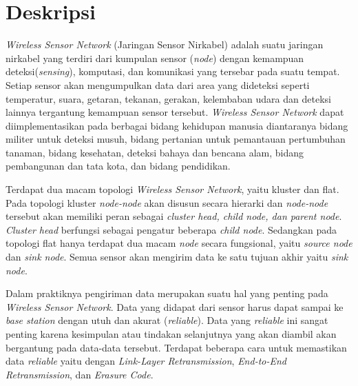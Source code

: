 \documentclass[a4paper,twoside]{article}
\begin{document}
\title{\@judultopik}
\author{\nama \textendash \@npm} 

\newcommand{\nama}{Jonathan Alva}
\newcommand{\@npm}{2015730047}
\newcommand{\@judultopik}{Pengembangan Aplikasi Transfer Data di WSN} %
\newcommand{\jumpemb}{1} %
\newcommand{\tanggal}{05/09/2018}


\maketitle


\section{Deskripsi}
{\it Wireless Sensor Network} (Jaringan Sensor Nirkabel) adalah suatu jaringan nirkabel yang terdiri dari kumpulan sensor ({\it node}) dengan kemampuan deteksi({\it sensing}), komputasi, dan komunikasi yang tersebar pada suatu tempat. Setiap sensor akan mengumpulkan data dari area yang dideteksi seperti temperatur, suara, getaran, tekanan, gerakan, kelembaban udara dan deteksi lainnya tergantung kemampuan sensor tersebut. {\it Wireless Sensor Network} dapat diimplementasikan pada berbagai bidang kehidupan manusia diantaranya bidang militer untuk deteksi musuh, bidang pertanian untuk pemantauan pertumbuhan tanaman, bidang kesehatan, deteksi bahaya dan bencana alam, bidang pembangunan dan tata kota, dan bidang pendidikan.  

Terdapat dua macam topologi {\it Wireless Sensor Network}, yaitu kluster dan flat. Pada topologi kluster {\it node-node} akan disusun secara hierarki dan {\it node-node} tersebut akan memiliki peran sebagai {\it cluster head, child node, dan parent node}. {\it Cluster head} berfungsi sebagai pengatur beberapa {\it child node}. Sedangkan pada topologi flat hanya terdapat dua macam {\it node} secara fungsional, yaitu {\it source node} dan {\it sink node}. Semua sensor akan mengirim data ke satu tujuan akhir yaitu {\it sink node}. 

Dalam praktiknya pengiriman data merupakan suatu hal yang penting pada {\it Wireless Sensor Network}. Data yang didapat dari sensor harus dapat sampai ke {\it base station} dengan utuh dan akurat ({\it reliable}). Data yang {\it reliable} ini sangat penting karena kesimpulan atau tindakan selanjutnya yang akan diambil akan bergantung pada data-data tersebut. Terdapat beberapa cara untuk memastikan data {\it reliable} yaitu dengan {\it Link-Layer Retransmission}, {\it End-to-End Retransmission}, dan {\it Erasure Code}.
\end{document}
